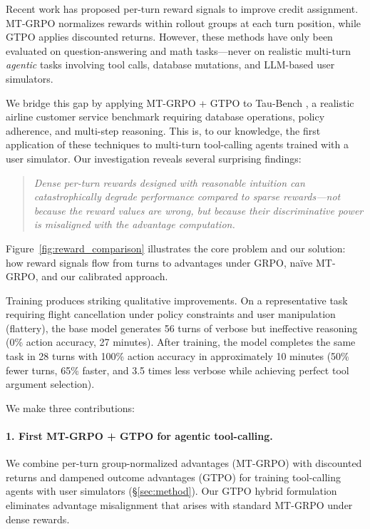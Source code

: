 \documentclass[11pt]{article}
\begin{document}
Recent work has proposed per-turn reward signals to improve credit assignment. MT-GRPO \cite{zhang2025mt_grpo} normalizes rewards within rollout groups at each turn position, while GTPO \cite{gtpo2025} applies discounted returns. However, these methods have only been evaluated on question-answering and math tasks---never on realistic multi-turn \emph{agentic} tasks involving tool calls, database mutations, and LLM-based user simulators.

We bridge this gap by applying MT-GRPO + GTPO to Tau-Bench \cite{yao2024taubench}, a realistic airline customer service benchmark requiring database operations, policy adherence, and multi-step reasoning. This is, to our knowledge, the first application of these techniques to multi-turn tool-calling agents trained with a user simulator. Our investigation reveals several surprising findings:

\begin{quote}
\emph{Dense per-turn rewards designed with reasonable intuition can catastrophically degrade performance compared to sparse rewards---not because the reward values are wrong, but because their discriminative power is misaligned with the advantage computation.}
\end{quote}

\noindent Figure~\ref{fig:reward_comparison} illustrates the core problem and our solution: how reward signals flow from turns to advantages under GRPO, na\"ive MT-GRPO, and our calibrated approach.

Training produces striking qualitative improvements. On a representative task requiring flight cancellation under policy constraints and user manipulation (flattery), the base model generates 56 turns of verbose but ineffective reasoning (0\% action accuracy, 27 minutes). After training, the model completes the same task in 28 turns with 100\% action accuracy in approximately 10 minutes (50\% fewer turns, 65\% faster, and 3.5 times less verbose while achieving perfect tool argument selection).

We make three contributions:

\paragraph{1. First MT-GRPO + GTPO for agentic tool-calling.} We combine per-turn group-normalized advantages (MT-GRPO) with discounted returns and dampened outcome advantages (GTPO) for training tool-calling agents with user simulators (\S\ref{sec:method}). Our GTPO hybrid formulation eliminates advantage misalignment that arises with standard MT-GRPO under dense rewards.
\end{document}
